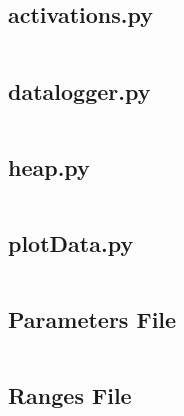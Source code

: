\begin{flushleft}
        \label{sec:activations.py}
        \subsection{activations.py}
        \inputminted[frame=leftline,framesep=2mm,baselinestretch=1.2,fontsize=\normalsize,linenos,breaklines]{python}{../Scripts/activations.py}

        \label{sec:datalogger.py}
        \subsection{datalogger.py}
        \inputminted[frame=leftline,framesep=2mm,baselinestretch=1.2,fontsize=\normalsize,linenos,breaklines]{python}{../Scripts/datalogger.py}

        \label{sec:heap.py}
        \subsection{heap.py}
        \inputminted[frame=leftline,framesep=2mm,baselinestretch=1.2,fontsize=\normalsize,linenos,breaklines]{python}{../Scripts/heap.py}

        \label{sec:plotData.py}
        \subsection{plotData.py}
        \inputminted[frame=leftline,framesep=2mm,baselinestretch=1.2,fontsize=\normalsize,linenos,breaklines]{python}{../Scripts/plotData.py}

        \label{sec:paramfile}
        \subsection{Parameters File}
        \inputminted[frame=leftline,framesep=2mm,baselinestretch=1.2,fontsize=\normalsize,linenos]{json}{../Parameters/Default.param}

        \label{sec:rangefile}
        \subsection{Ranges File}
        \inputminted[frame=leftline,framesep=2mm,baselinestretch=1.2,fontsize=\normalsize,linenos]{json}{../Parameters/Range.param}

\end{flushleft}